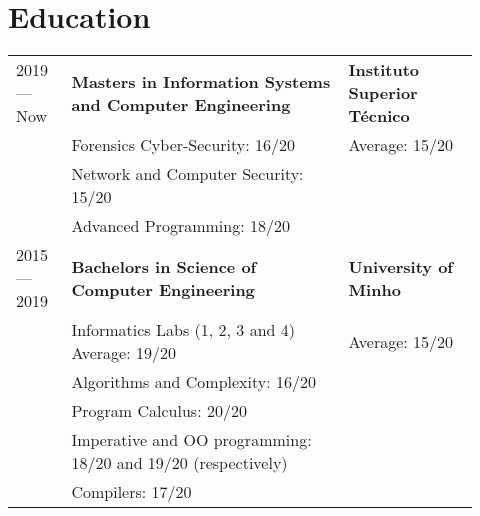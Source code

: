 \documentclass{article}
\begin{document}
\begin{tabular}{p{0.11\linewidth}p{0.73\linewidth}l}
\end{tabular}

\section{Education}

\begin{tabular}{p{0.11\linewidth}p{0.55\linewidth}p{0.26\linewidth}}

    2019 --- Now
    &
        \textbf{Masters in Information Systems and Computer Engineering}
    &
        \textbf{Instituto Superior Técnico}
    \\
    & Forensics Cyber-Security: 16/20 & Average: 15/20 \\
    & Network and Computer Security: 15/20 &\\
    & Advanced Programming: 18/20 &\\

    2015 --- 2019
    &
        \textbf{Bachelors in Science of Computer Engineering}
    &
        \textbf{University of Minho}
    \\
    & Informatics Labs (1, 2, 3 and 4) Average: 19/20 & Average: 15/20 \\
    & Algorithms and Complexity: 16/20 & \\
    & Program Calculus: 20/20 & \\
    & Imperative and OO programming: 18/20 and 19/20 (respectively) &\\
    & Compilers: 17/20 &\\

\end{tabular}


\end{document}
